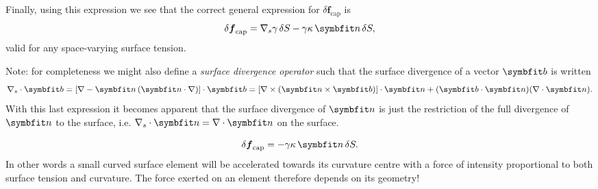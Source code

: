 {\noindent Finally, using this expression we see that the correct general expression for $\delta \boldsymbol f_\text{cap}$ is 
\begin{equation}
\delta \boldsymbol f_\text{cap} = \nabla_s \gamma \, \delta S - \gamma \kappa \, \bn \, \delta S,
\label{eq:capillaryforce_marangoni}
\end{equation}
valid for any space-varying surface tension.

\noindent Note: for completeness we might also define a \textit{surface divergence operator} such that the surface divergence of a vector $\bb$ is written 
\begin{equation}
\nabla_s \cdot\bb = \left[\nabla-\bn\lp\bn\cdot\nabla\rp\right]\cdot\bb=\left[\nabla \times (\bn\times\bb)\right]\cdot\bn+(\bb\cdot\bn)(\nabla\cdot\bn).
\end{equation}
With this last expression it becomes apparent that the surface divergence of $\bn$ is just the restriction of the full divergence of $\bn$ to the surface, i.e. $\nabla_s\cdot\bn=\nabla\cdot\bn$ on the surface.
}
\begin{equation}
\delta \boldsymbol f_\text{cap} = - \gamma \kappa \, \bn \, \delta S.
\end{equation}
In other words a small curved surface element will be accelerated towards its curvature centre with a force of intensity proportional to both surface tension and curvature. The force exerted on an element therefore depends on its geometry!

